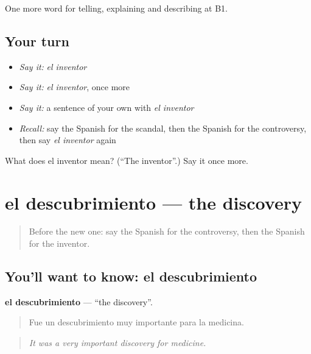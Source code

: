 \begin{grammarlens}[title={What you've built}]
One more word for telling, explaining and describing at B1.
\end{grammarlens}

\subsection*{Your turn}
\begin{itemize}
\raggedright
  \item \emph{Say it:} \emph{el inventor}
  \item \emph{Say it:} \emph{el inventor}, once more
  \item \emph{Say it:} a sentence of your own with \emph{el inventor}
  \item \emph{Recall:} say the Spanish for the scandal, then the Spanish for the controversy, then say \emph{el inventor} again
\end{itemize}

\begin{tcolorbox}[breakable,colback=teal!4,colframe=teal!35!black,title={Before you move on}]
What does el inventor mean? (\textquotedblleft{}The inventor\textquotedblright{}.) Say it once more.
\end{tcolorbox}
\section[el descubrimiento]{el descubrimiento — the discovery}

\label{lesson:ES-C571-descubrimiento}



\begin{quote}
Before the new one: say the Spanish for the controversy, then the Spanish for the inventor.
\end{quote}

\subsection*{You'll want to know: el descubrimiento}
\textbf{el descubrimiento} — \textquotedblleft{}the discovery\textquotedblright{}.

\begin{quote}
Fue un descubrimiento muy importante para la medicina.
\end{quote}

\begin{quote}
\emph{It was a very important discovery for medicine.}
\end{quote}

